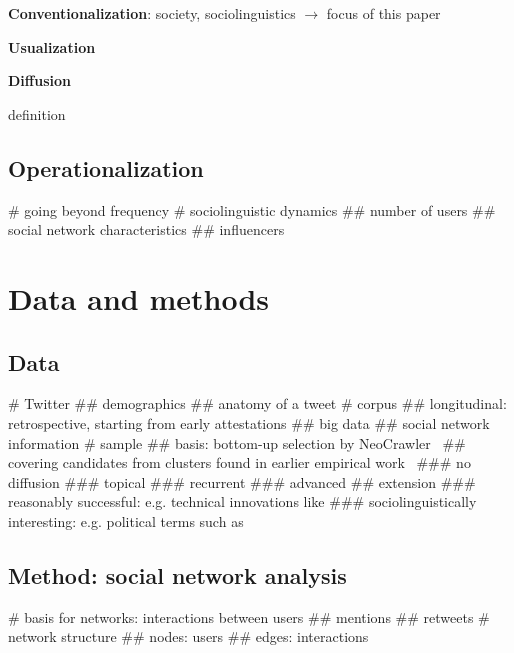 \documentclass[a4paper]{scrartcl}
\renewcommand{\hw}[1]{\textbf{#1}}
\begin{document}
    \hw{Conventionalization}: society, sociolinguistics $\rightarrow$ focus of this paper

    \hw{Usualization}

    \hw{Diffusion}

      definition

  \subsection{Operationalization}

    \begin{easylist}[itemize]
      # going beyond frequency
      # sociolinguistic dynamics
        ## number of users
        ## social network characteristics
        ## influencers
    \end{easylist}

\section{Data and methods}

  \subsection{Data}

    \begin{easylist}[itemize]
      # Twitter
        ## demographics
        ## anatomy of a tweet
      # corpus
        ## longitudinal: retrospective, starting from early attestations
        ## big data
        ## social network information
      # sample
        ## basis: bottom-up selection by NeoCrawler~\parencite{Kerremans2018}
        ## covering candidates from clusters found in earlier empirical work~\parencite{Kerremans2015}
          ### no diffusion
          ### topical
          ### recurrent
          ### advanced
        ## extension
          ### reasonably successful: e.g. technical innovations like 
          ### sociolinguistically interesting: e.g. political terms such as 
    \end{easylist}

  \subsection{Method: social network analysis}

    \begin{easylist}[itemize]
      # basis for networks: interactions between users
        ## mentions
        ## retweets
      # network structure
        ## nodes: users
        ## edges: interactions
    \end{easylist}
\end{document}
